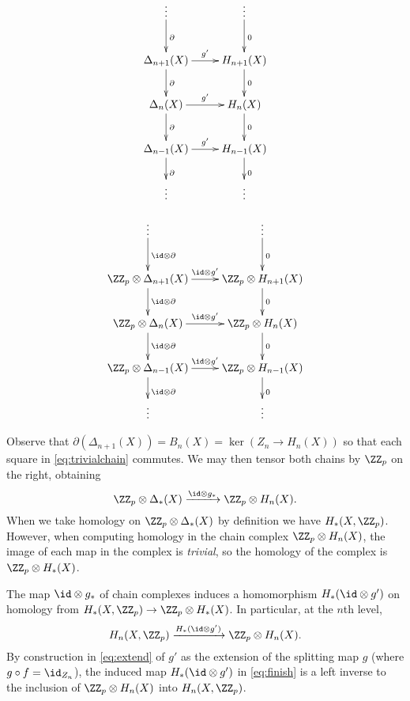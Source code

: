 \documentclass[10pt]{amsart}
\begin{document}
\begin{minipage}{.5\textwidth}
\begin{equation}
\xymatrix{
\vdots \ar[d]^\partial & \vdots \ar[d]^0\\
\Delta_{n+1}(X) \ar[r]^{g'} \ar[d]^\partial & H_{n+1}(X) \ar[d]^0\\
\Delta_{n}(X) \ar[r]^{g'} \ar[d]^\partial& H_{n}(X) \ar[d]^0\\
\Delta_{n-1}(X) \ar[r]^{g'} \ar[d]^\partial& H_{n-1}(X) \ar[d]^0\\
\vdots & \vdots\\
}\label{eq:trivialchain}\end{equation}
\end{minipage}
\begin{minipage}{.5\textwidth}
\begin{equation}
\xymatrix{
\vdots \ar[d]^{\id\otimes\partial} & \vdots \ar[d]^0\\
\ZZ_p\otimes\Delta_{n+1}(X) \ar[r]^{\id \otimes g'} \ar[d]^{\id \otimes \partial} & \ZZ_p\otimes H_{n+1}(X) \ar[d]^0\\
\ZZ_p\otimes\Delta_{n}(X)   \ar[r]^{\id \otimes g'} \ar[d]^{\id \otimes \partial} & \ZZ_p\otimes H_{n}(X)   \ar[d]^0\\
\ZZ_p\otimes\Delta_{n-1}(X) \ar[r]^{\id \otimes g'} \ar[d]^{\id \otimes \partial} & \ZZ_p\otimes H_{n-1}(X) \ar[d]^0\\
\vdots & \vdots\\
}\end{equation}
\end{minipage}

Observe that
\(\partial(\Delta_{n+1}(X)) = B_n(X) = \ker\left(Z_n \to H_n(X)\right)\)
so that each square in \eqref{eq:trivialchain} commutes. We may then
tensor both chains by \(\ZZ_p\) on the right, obtaining
\[\ZZ_p \otimes \Delta_*(X) \xrightarrow{\id \otimes g_*} \ZZ_p \otimes H_n(X).\]
When we take homology on \(\ZZ_p \otimes \Delta_*(X)\) by definition we
have \(H_*(X, \ZZ_p)\). However, when computing homology in the chain
complex \(\ZZ_p \otimes H_n(X)\), the image of each map in the complex
is \emph{trivial}, so the homology of the complex is
\(\ZZ_p \otimes H_*(X)\).

The map \({\id \otimes g_*}\) of chain complexes induces a homomorphism
\(H_*(\id\otimes g')\) on homology from
\(H_*(X, \ZZ_p) \to \ZZ_p \otimes H_*(X)\). In particular, at the
\(n\)th level,
\begin{equation}\label{eq:finish}H_n(X, \ZZ_p) \xrightarrow{H_*(\id \otimes g')} \ZZ_p \otimes H_n(X).\end{equation}
By construction in \eqref{eq:extend} of \(g'\) as the extension of the
splitting map \(g\) (where \(g \circ f = \id_{Z_n}\)), the induced map
\(H_*(\id \otimes g')\) in \eqref{eq:finish} is a left inverse to the
inclusion of \(\ZZ_p \otimes H_n(X)\) into \(H_n(X, \ZZ_p)\). \qedsymbol
\end{document}
